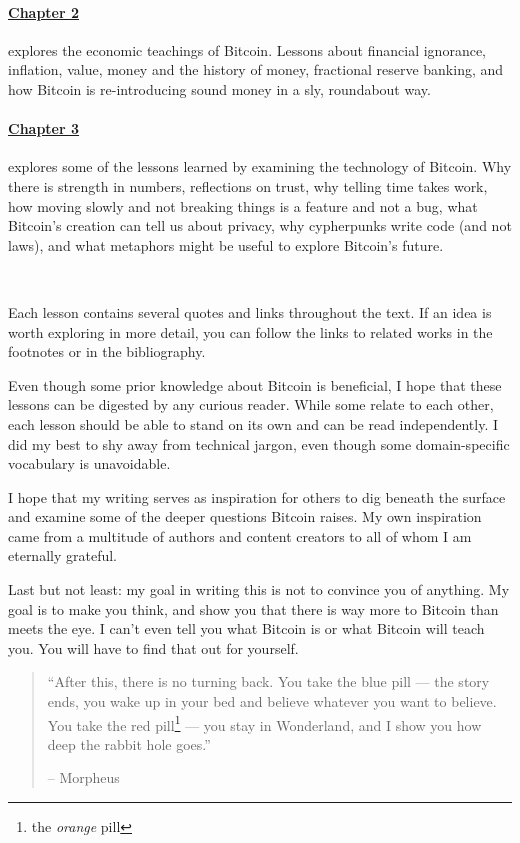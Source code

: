 \paragraph{\hyperref[ch:economics]{Chapter 2}}{explores the economic teachings
of Bitcoin. Lessons about financial ignorance, inflation, value, money and the
history of money, fractional reserve banking, and how Bitcoin is re-introducing
sound money in a sly, roundabout way.}

\paragraph{\hyperref[ch:technology]{Chapter 3}}{explores some of the lessons
learned by examining the technology of Bitcoin.  Why there is strength in
numbers, reflections on trust, why telling time takes work, how moving slowly
and not breaking things is a feature and not a bug, what Bitcoin's creation can
tell us about privacy, why cypherpunks write code (and not laws), and what
metaphors might be useful to explore Bitcoin's future.}

~

Each lesson contains several quotes and links throughout the text. If an idea is
worth exploring in more detail, you can follow the links to related works in the
footnotes or in the bibliography.

Even though some prior knowledge about Bitcoin is beneficial, I hope that these
lessons can be digested by any curious reader. While some relate to each other,
each lesson should be able to stand on its own and can be read independently. I
did my best to shy away from technical jargon, even though some domain-specific
vocabulary is unavoidable.

I hope that my writing serves as inspiration for others to dig beneath the
surface and examine some of the deeper questions Bitcoin raises. My own
inspiration came from a multitude of authors and content creators to all of whom
I am eternally grateful.

Last but not least: my goal in writing this is not to convince you of anything.
My goal is to make you think, and show you that there is way more to Bitcoin
than meets the eye. I can’t even tell you what Bitcoin is or what Bitcoin will
teach you. You will have to find that out for yourself.

\begin{quotation}\begin{samepage}
\enquote{After this, there is no turning back. You take the blue pill --- the
story ends, you wake up in your bed and believe whatever you want to
believe. You take the red pill\footnote{the \textit{orange} pill} --- you stay in Wonderland, and I show
you how deep the rabbit hole goes.}
\begin{flushright} -- Morpheus
\end{flushright}\end{samepage}\end{quotation}


